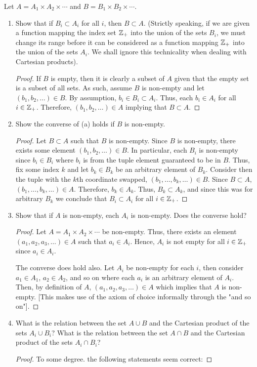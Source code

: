 \documentclass[12pt]{article}
\begin{document}
	 Let $A = A_1 \times A_2 \times \cdots$ and $B = B_1 \times B_2 \times \cdots$.
	\begin{enumerate}[label=(\alph*)]
		\item Show that if $B_i \subset A_i$ for all $i$, then $B \subset A$. (Strictly speaking, if we are
		given a function mapping the index set $\mathbb{Z}_{+}$ into the union of the sets $B_i$, we must change
		its range before it can be considered as a function mapping $\mathbb{Z}_{+}$ into the union of the sets
		$A_i$. We shall ignore this technicality when dealing with Cartesian products).
		\begin{proof}
			If $B$ is empty, then it is clearly a subset of $A$ given that the empty set is a subset of all sets.
			As such, assume $B$ is non-empty and let $(b_1, b_2, \ldots) \in B$. By assumption, $b_i \in B_i \subset A_i$.
			Thus, each $b_i \in A_i$ for all $i \in \mathbb{Z}_{+}$.
			Therefore, $(b_1, b_2, \ldots) \in A$ implying that $B \subset A$.
		\end{proof}
		\item Show the converse of (a) holds if $B$ is non-empty.
		\begin{proof}
			Let $B \subset A$ such that $B$ is non-empty. Since $B$ is non-empty,
			there exists some element $(b_1, b_2, \ldots) \in B$. In particular,
			each $B_i$ is non-empty since $b_i \in B_i$ where $b_i$ is 
			from the tuple element guaranteed to be in $B$. Thus, fix some index $k$
			and let $b_k \in B_k$ be an arbitrary element of $B_k$. Consider then the tuple with the $k$th 
			coordinate swapped, $(b_1, \ldots, b_k, \ldots) \in B$.
			Since $B \subset A$, $(b_1, \ldots, b_k, \ldots) \in A$. Therefore,
			$b_k \in A_k$. Thus, $B_k \subset A_k$, and since this was for 
			arbitrary $B_k$ we conclude that $B_i \subset A_i$ for all $i \in \mathbb{Z}_{+}$.
		\end{proof}
		\item Show that if $A$ is non-empty, each $A_i$ is non-empty. Does the converse hold?
		\begin{proof}
			Let $A = A_1 \times A_2 \times \cdots$ be non-empty. Thus, there exists an element
			$(a_1, a_2, a_3, \ldots) \in A$ such that $a_i \in A_i$. Hence,
			$A_i$ is not empty for all $i \in \mathbb{Z}_{+}$ since $a_i \in A_i$.
			
			The converse does hold also. Let $A_i$ be non-empty for each $i$,
			then consider $a_1 \in A_1$, $a_2 \in A_2$, and so on where each $a_i$
			is an arbitrary element of $A_i$. Then, by definition of $A$,
			$(a_1, a_2, a_3, \ldots) \in A$ which implies that $A$ is non-empty.
			[This makes use of the axiom of choice informally through the "and so on"].
		\end{proof}
		\item What is the relation between the set $A \cup B$ and the Cartesian product of the sets
		$A_i \cup B_i$? What is the relation between the set $A \cap B$ and the Cartesian product of the sets
		$A_i \cap B_i$?
		\begin{proof}
			To some degree. the following statements seem correct:


\end{proof}
\end{enumerate}
\end{document}
